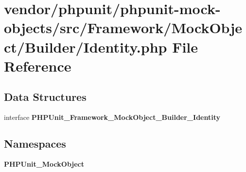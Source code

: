 \section{vendor/phpunit/phpunit-\/mock-\/objects/src/\+Framework/\+Mock\+Object/\+Builder/\+Identity.php File Reference}
\label{_identity_8php}
\subsection*{Data Structures}
\begin{DoxyCompactItemize}
\item 
interface {\bf P\+H\+P\+Unit\+\_\+\+Framework\+\_\+\+Mock\+Object\+\_\+\+Builder\+\_\+\+Identity}
\end{DoxyCompactItemize}
\subsection*{Namespaces}
\begin{DoxyCompactItemize}
\item 
 {\bf P\+H\+P\+Unit\+\_\+\+Mock\+Object}
\end{DoxyCompactItemize}
